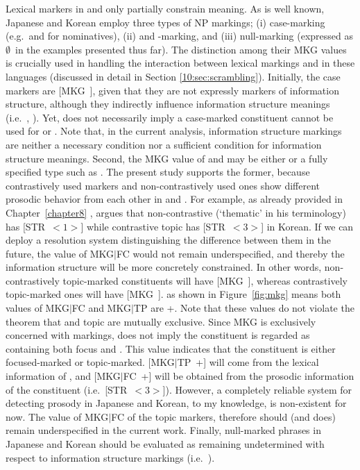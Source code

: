 Lexical markers in  and  only partially
constrain meaning. As is well known, Japanese and Korean employ three
types of NP markings; (i) case-marking (e.g.\ \ga and \ika for
nominatives), (ii) \wa and \onun-marking, and (iii) null-marking
(expressed as \ensuremath{\emptyset}~in the examples presented thus far). The distinction among their MKG values is crucially used in
handling the interaction between lexical markings and 
in these languages (discussed in detail in Section \ref{10:sec:scrambling}).
Initially, the case markers are \mbox{[MKG ]},
given that they are not expressly markers of information structure,
although they indirectly influence information structure meanings
(i.e.\ , \citealt{heycock:94}). Yet,  does
not necessarily imply a case-marked constituent cannot be used for
 or . Note that, in the current analysis,
information structure markings are neither a necessary condition nor a
sufficient condition for information structure meanings.  Second, the
MKG value of \wa and \nun may be either  or a fully specified
type such as . The present study supports the former,
because contrastively used markers and non-contrastively used ones show
different prosodic behavior from each other in  and
 \citep{chang:02,nakanishi:07}.  For example, as already
provided in Chapter~\ref{chapter8} ,
\citet{chang:02} argues that non-contrastive (`thematic' in his
terminology)  has \mbox{[STR \ensuremath{<1>}]} while
contrastive topic has \mbox{[STR \ensuremath{<3>}]} in
Korean. If we can deploy a resolution system
distinguishing the difference between them in the future, the value of
\mbox{MKG{$\mid$}FC} would not remain underspecified, and thereby the
information structure will be more concretely
constrained. In other words, non-contrastively
topic-marked constituents will have \mbox{[MKG ]},
whereas contrastively topic-marked ones will have \mbox{[MKG
    ]}.  as shown in Figure~\ref{fig:mkg}
means both values of MKG{$\mid$}FC and MKG{$\mid$}TP are +. Note that
these values do not violate the theorem that  and topic are
mutually exclusive.  Since MKG is exclusively concerned with markings,
 does not imply the constituent is regarded as containing
both focus and .  This value indicates that the constituent
is either focused-marked or topic-marked.  \mbox{[MKG{$\mid$}TP +]}
will come from the lexical information of \nun, and
\mbox{[MKG{$\mid$}FC +]} will be obtained from the prosodic
information of the constituent (i.e.\ \mbox{[STR
    \ensuremath{<3>}]}). However, a completely reliable
system for detecting prosody in Japanese and Korean, to my knowledge,
is non-existent for now.  The value of MKG{$\mid$}FC of the topic
markers, therefore should (and does) remain underspecified in the
current work.  Finally, null-marked phrases in Japanese and Korean
should be evaluated as remaining undetermined with respect to
information structure markings
(i.e.\ ).




